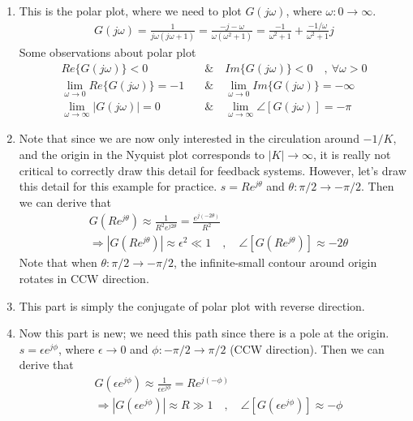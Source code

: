 \documentclass[twoside]{article}
\begin{document}
\begin{enumerate}
  \item This is the polar plot, where we need to plot $G(j \omega)$, where $\omega : 0 \to
    \infty$. 
    \begin{align*}
      G(j \omega) = \frac{1}{j \omega (j \omega +1)} = \frac{ -j  - \omega }{\omega
      (\omega^2 + 1) } = \frac{-1}{\omega^2 + 1} + \frac{-1/\omega}{
      \omega^2 + 1} j
    \end{align*}
%
   Some observations about polar plot
    \begin{align*}
       Re \lbrace G(j \omega) \rbrace < 0 \quad & \&  \quad  Im \lbrace G(j
                                                \omega) \rbrace < 0 \quad , \ \forall  \omega > 0 
      \\
        \lim_{\omega \to 0} Re \lbrace G(j \omega) \rbrace = - 1
       \quad & \& \quad
       \lim_{\omega \to 0} Im \lbrace G(j \omega) \rbrace = - \infty
        \\
       \lim_{\omega \to \infty} | G(j \omega) | = 0
        \quad & \& \quad
      \lim_{\omega \to \infty} \angle [ G(j \omega) ] = -\pi
      \end{align*}
  \item Note that since we are now only interested in the circulation around
    $-1/K$, and the origin in the Nyquist plot corresponds to $| K | \to
    \infty$, it is really not critical to correctly draw this
    detail for feedback systems. 
     However, let's draw this detail for this example for practice. 
     $s = R e^{j \theta}$ and $\theta : \pi/2 \to -\pi/2$.  Then 
   we can derive that  
   \begin{align*}
     & G \left( R e^{j \theta} \right) \approx \frac{1}{R^2 e^{j
       2 \theta}} = \frac{e^{j (-2 \theta)}}{R^2}
       \\
    &\Rightarrow | G \left( R e^{j \theta} \right) | \approx
      \epsilon^2 \ll 1
   \quad , \quad \angle [ G \left( R e^{j \theta} \right) ] \approx -2
      \theta
   \end{align*}
   Note that when $\theta : \pi/2 \to -\pi/2$, the infinite-small 
   contour around origin rotates in CCW direction. 
   \item This part is simply the conjugate of polar plot with reverse
     direction. 
  \item Now this part is new; we need this path
    since there is a pole at the origin. 
     $s = \epsilon e^{j \phi}$, where $\epsilon \to 0$ and $\phi :
     -\pi/2 \to \pi/2$ (CCW direction).  Then  we can derive that  
   \begin{align*}
     & G \left( \epsilon e^{j \phi} \right) \approx \frac{1}{\epsilon e^{j
        \phi}} = R e^{j (-\phi)}
       \\
    &\Rightarrow | G \left(\epsilon e^{j \phi} \right) | \approx
     R \gg 1
   \quad , \quad \angle [ G \left( \epsilon e^{j \phi} \right) ] \approx -\phi
   \end{align*}
\end{enumerate}
\end{document}
